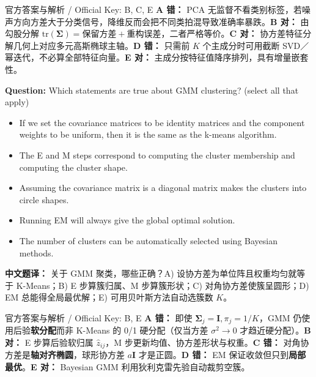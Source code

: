 \begin{StudySolution}{官方答案与解析 / Official Key: B, C, E}
\textbf{A 错：} PCA 无监督不看类别标签，若噪声方向方差大于分类信号，降维反而会把不同类拍混导致准确率暴跌。\textbf{B 对：} 由勾股分解 $\mathrm{tr}(\boldsymbol{\Sigma}) = \text{保留方差} + \text{重构误差}$，二者严格等价。\textbf{C 对：} 协方差特征分解几何上对应多元高斯椭球主轴。\textbf{D 错：} 只需前 $K$ 个主成分时可用截断 SVD／幂迭代，不必算全部特征向量。\textbf{E 对：} 主成分按特征值降序排列，具有增量嵌套性。
\end{StudySolution}

\textbf{Question:} Which statements are true about GMM clustering? (select all that apply)
\begin{itemize}
\item[A)] If we set the covariance matrices to be identity matrices and the component weights to be uniform, then it is the same as the k-means algorithm.
\item[B)] The E and M steps correspond to computing the cluster membership and computing the cluster shape.
\item[C)] Assuming the covariance matrix is a diagonal matrix makes the clusters into circle shapes.
\item[D)] Running EM will always give the global optimal solution.
\item[E)] The number of clusters can be automatically selected using Bayesian methods.
\end{itemize}
\textbf{中文题译：} 关于 GMM 聚类，哪些正确？A) 设协方差为单位阵且权重均匀就等于 K-Means；B) E 步算簇归属、M 步算簇形状；C) 对角协方差使簇呈圆形；D) EM 总能得全局最优解；E) 可用贝叶斯方法自动选簇数 $K$。

\begin{StudySolution}{官方答案与解析 / Official Key: B, E}
\textbf{A 错：} 即使 $\boldsymbol{\Sigma}_j=\mathbf{I},\pi_j=1/K$，GMM 仍使用后验\textbf{软分配}而非 K-Means 的 0/1 硬分配（仅当方差 $\sigma^2\to 0$ 才趋近硬分配）。\textbf{B 对：} E 步算后验软归属 $\hat{z}_{ij}$，M 步更新均值、协方差形状与权重。\textbf{C 错：} 对角协方差是\textbf{轴对齐椭圆}，球形协方差 $a\mathbf{I}$ 才是正圆。\textbf{D 错：} EM 保证收敛但只到\textbf{局部最优}。\textbf{E 对：} Bayesian GMM 利用狄利克雷先验自动裁剪空簇。
\end{StudySolution}

